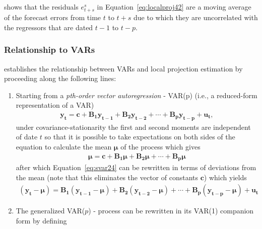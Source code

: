 \documentclass[a4paper,11pt,listof=nochaptergap,oneside,pointednumbers,bibtotoc,bigheadings,liststotoc]{scrbook}
\renewcommand*{\paragraph}[1]{\subsubsection*{#1} \vspace{-3mm}} %
\newcommand{\vect}[1]{\boldsymbol{\mathbf{#1}}}
\begin{document}
\citet{jorda:05} shows that the residuals $e_{t+s}^s$ in Equation~\ref{eq:localproj42} are a moving average of the forecast errors from time $t$ to $t+s$ due to which they are uncorrelated with the regressors that are dated $t-1$ to $t-p$. 

\paragraph{Relationship to VARs}
\citet{jorda:05} establishes the relationship between VARs and local projection estimation by proceeding along the following lines:
\begin{enumerate}
	\item Starting from a \textit{pth-order vector autoregression} - VAR(p) (i.e., a reduced-form representation of a VAR)
	\begin{equation} \label{eq:svar24}
	\begin{split}
		\vect{y_t} = \vect{c} + \vect{B_1}\vect{y_{t-1}} + \vect{B_2}\vect{y_{t-2}} + \cdots + \vect{B_p}\vect{y_{t-p}} + \vect{u_t},
	\end{split}								
	\end{equation}	
	under covariance-stationarity the first and second moments are independent of date $t$ so that it is possible to take expectations on both sides of the equation to calculate the mean $\vect{\mu}$ of the process which gives
	\begin{equation} \label{eq:svar25}
	\begin{split}
		\vect{\mu} = \vect{c} + \vect{B_1}\vect{\mu} + \vect{B_2}\vect{\mu}+\cdots + \vect{B_p}\vect{\mu}
	\end{split}								
	\end{equation}	
	after which Equation~\ref{eq:svar24} can be rewritten in terms of deviations from the mean (note that this eliminates the vector of constants $\vect{c}$) which yields
	\begin{equation} \label{eq:svar26}
	\begin{split}
		(\vect{y_t} - \vect{\mu}) = \vect{B_1}(\vect{y_{t-1}} - \vect{\mu}) + \vect{B_2}(\vect{y_{t-2}} - \vect{\mu}) + \cdots + \vect{B_p}(\vect{y_{t-p}} - \vect{\mu}) + \vect{u_t}
	\end{split}								
	\end{equation}	
	\item The generalized VAR($p$) - process can be rewritten in its VAR(1) companion form by defining
	\begin{equation} \label{eq:svar27}
	\begin{split}

\end{split}
\end{equation}
\end{enumerate}
\end{document}
